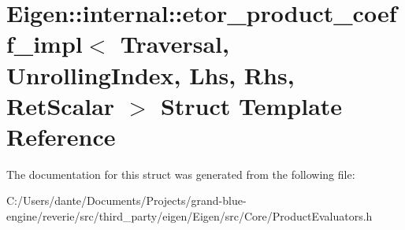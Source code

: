 \hypertarget{struct_eigen_1_1internal_1_1etor__product__coeff__impl}{}\section{Eigen\+::internal\+::etor\+\_\+product\+\_\+coeff\+\_\+impl$<$ Traversal, Unrolling\+Index, Lhs, Rhs, Ret\+Scalar $>$ Struct Template Reference}
\label{struct_eigen_1_1internal_1_1etor__product__coeff__impl}


The documentation for this struct was generated from the following file\+:\begin{DoxyCompactItemize}
\item 
C\+:/\+Users/dante/\+Documents/\+Projects/grand-\/blue-\/engine/reverie/src/third\+\_\+party/eigen/\+Eigen/src/\+Core/Product\+Evaluators.\+h\end{DoxyCompactItemize}
